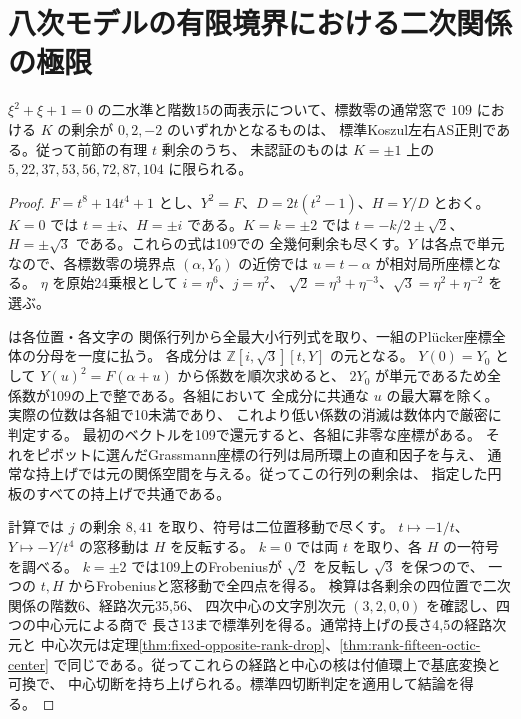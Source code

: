\section{八次モデルの有限境界における二次関係の極限}
\label{sec:rank-fifteen-octic-boundary}
\begin{theorem}\label{thm:rank-fifteen-octic-boundary}
$\xi^2+\xi+1=0$ の二水準と階数15の両表示について、標数零の通常窓で
$109$ における $K$ の剰余が $0,2,-2$ のいずれかとなるものは、
標準Koszul左右AS正則である。従って前節の有理 $t$ 剰余のうち、
未認証のものは $K=\pm1$ 上の
$5,22,37,53,56,72,87,104$ に限られる。
\end{theorem}
\begin{proof}
$F=t^8+14t^4+1$ とし、$Y^2=F$、$D=2t(t^2-1)$、$H=Y/D$ とおく。
$K=0$ では $t=\pm i$、$H=\pm i$ である。$K=k=\pm2$ では
$t=-k/2\pm\sqrt2$、$H=\pm\sqrt3$ である。これらの式は109での
全幾何剰余も尽くす。$Y$ は各点で単元なので、各標数零の境界点
$(\alpha,Y_0)$ の近傍では $u=t-\alpha$ が相対局所座標となる。
$\eta$ を原始24乗根として $i=\eta^6$、$j=\eta^2$、
$\sqrt2=\eta^3+\eta^{-3}$、$\sqrt3=\eta^2+\eta^{-2}$ を選ぶ。

 は各位置・各文字の
関係行列から全最大小行列式を取り、一組のPl\"ucker座標全体の分母を一度に払う。
各成分は $\mathbb Z[i,\sqrt3][t,Y]$ の元となる。
$Y(0)=Y_0$ として $Y(u)^2=F(\alpha+u)$ から係数を順次求めると、
$2Y_0$ が単元であるため全係数が109の上で整である。各組において
全成分に共通な $u$ の最大冪を除く。実際の位数は各組で10未満であり、
これより低い係数の消滅は数体内で厳密に判定する。
最初のベクトルを109で還元すると、各組に非零な座標がある。
それをピボットに選んだGrassmann座標の行列は局所環上の直和因子を与え、
通常な持上げでは元の関係空間を与える。従ってこの行列の剰余は、
指定した円板のすべての持上げで共通である。

計算では $j$ の剰余 $8,41$ を取り、符号は二位置移動で尽くす。
$t\mapsto-1/t$、$Y\mapsto-Y/t^4$ の窓移動は $H$ を反転する。
$k=0$ では両 $t$ を取り、各 $H$ の一符号を調べる。
$k=\pm2$ では109上のFrobeniusが $\sqrt2$ を反転し $\sqrt3$ を保つので、
一つの $t,H$ からFrobeniusと窓移動で全四点を得る。
検算は各剰余の四位置で二次関係の階数6、経路次元35,56、
四次中心の文字別次元 $(3,2,0,0)$ を確認し、四つの中心元による商で
長さ13まで標準列を得る。通常持上げの長さ4,5の経路次元と
中心次元は定理\ref{thm:fixed-opposite-rank-drop}、\ref{thm:rank-fifteen-octic-center}
で同じである。従ってこれらの経路と中心の核は付値環上で基底変換と可換で、
中心切断を持ち上げられる。標準四切断判定を適用して結論を得る。
\end{proof}

